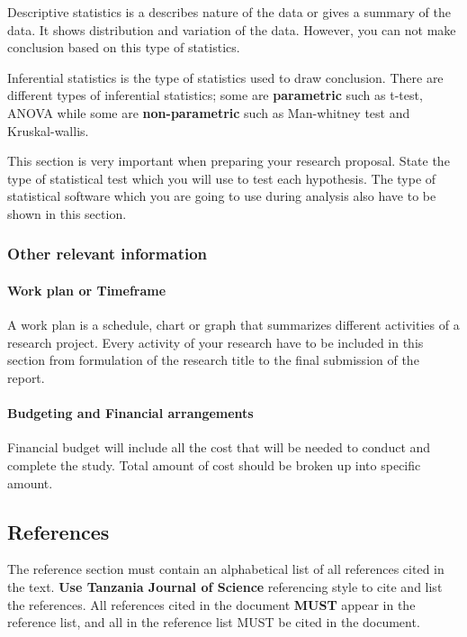 \documentclass[
  12pt,
  a4paper,
  DIV=11,
  numbers=noendperiod]{scrartcl}
\let\oldparagraph\paragraph
\renewcommand{\paragraph}[1]{\oldparagraph{#1}\mbox{}}
\begin{document}
Descriptive statistics is a describes nature of the data or gives a
summary of the data. It shows distribution and variation of the data.
However, you can not make conclusion based on this type of statistics.

Inferential statistics is the type of statistics used to draw
conclusion. There are different types of inferential statistics; some
are \textbf{parametric} such as t-test, ANOVA while some are
\textbf{non-parametric} such as Man-whitney test and Kruskal-wallis.

This section is very important when preparing your research proposal.
State the type of statistical test which you will use to test each
hypothesis. The type of statistical software which you are going to use
during analysis also have to be shown in this section.

\hypertarget{other-relevant-information}{%
\subsubsection{Other relevant
information}\label{other-relevant-information}}

\hypertarget{work-plan-or-timeframe}{%
\paragraph{Work plan or Timeframe}\label{work-plan-or-timeframe}}

A work plan is a schedule, chart or graph that summarizes different
activities of a research project. Every activity of your research have
to be included in this section from formulation of the research title to
the final submission of the report.

\hypertarget{budgeting-and-financial-arrangements}{%
\paragraph{Budgeting and Financial
arrangements}\label{budgeting-and-financial-arrangements}}

Financial budget will include all the cost that will be needed to
conduct and complete the study. Total amount of cost should be broken up
into specific amount.

\hypertarget{references}{%
\subsection{References}\label{references}}

The reference section must contain an alphabetical list of all
references cited in the text. \textbf{Use Tanzania Journal of Science}
referencing style to cite and list the references. All references cited
in the document \textbf{MUST} appear in the reference list, and all in
the reference list MUST be cited in the document.
\end{document}
